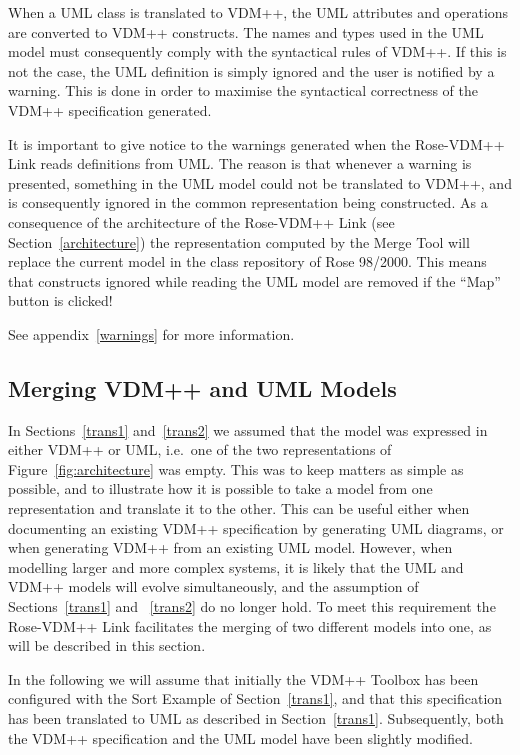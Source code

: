 \documentclass[\pformat,12pt]{article}
\newcommand{\vdmpp}{VDM++}
\newcommand{\link}{Rose-\vdmpp{} Link}
\newcommand{\rose}{Rose 98/2000}
\begin{document}
When a UML class is translated to \vdmpp{}, the UML attributes and
operations are converted to \vdmpp{} constructs.  The names and types
used in the UML model must consequently comply with the syntactical
rules of \vdmpp{}. If this is not the case, the UML definition is
simply ignored and the user is notified by a warning.  This is done in
order to maximise the syntactical correctness of the \vdmpp{}
specification generated.

It is important to give notice to the warnings generated when the
\link{} reads definitions from UML. The reason is that whenever a
warning is presented, something in the UML model could not be
translated to \vdmpp{}, and is consequently ignored in the common
representation being constructed. As a consequence of the architecture
of the \link{} (see Section~\ref{architecture}) the representation
computed by the Merge Tool will replace the current model in the class
repository of \rose{}. This means that constructs ignored while
reading the UML model are removed if the ``Map'' button is clicked!

See appendix~\ref{warnings} for more information.

\subsection{Merging VDM++ and UML Models}
\label{merging}

In Sections~\ref{trans1} and~\ref{trans2} we assumed that the model
was expressed in either \vdmpp{} or UML, i.e.\ one of the two 
representations of Figure~\ref{fig:architecture} was empty. This was
to keep matters as simple as possible, and to illustrate how it is
possible to take a model from one representation and translate it to
the other. This can be useful either when documenting an existing
\vdmpp{} specification by generating UML diagrams, or when generating
\vdmpp{} from an existing UML model. However, when modelling larger
and more complex systems, it is likely that the UML and \vdmpp{}
models will evolve simultaneously, and the assumption of
Sections~\ref{trans1} and ~\ref{trans2} do no longer hold. To meet
this requirement the \link{} facilitates the merging of two different
models into one, as will be described in this section.  

In the following we will assume that initially the \vdmpp{} Toolbox
has been configured with the Sort Example of Section~\ref{trans1}, and
that this specification has been translated to UML as described in
Section~\ref{trans1}. Subsequently, both the \vdmpp{} specification
and the UML model have been slightly modified.
\end{document}
